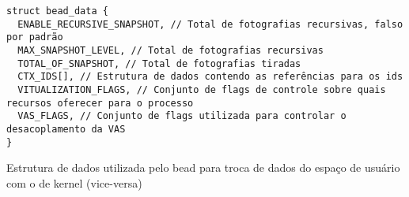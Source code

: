 \begin{pseudocode}

\begin{lstlisting}[language=pseudocode, style=pseudocode]
struct bead_data {
  ENABLE_RECURSIVE_SNAPSHOT, // Total de fotografias recursivas, falso por padrão
  MAX_SNAPSHOT_LEVEL, // Total de fotografias recursivas
  TOTAL_OF_SNAPSHOT, // Total de fotografias tiradas
  CTX_IDS[], // Estrutura de dados contendo as referências para os ids
  VITUALIZATION_FLAGS, // Conjunto de flags de controle sobre quais recursos oferecer para o processo
  VAS_FLAGS, // Conjunto de flags utilizada para controlar o desacoplamento da VAS
}

\end{lstlisting}

  \label{alg:beadata}
  \caption{Estrutura de dados utilizada pelo bead para troca de dados do espaço de usuário com o de kernel (vice-versa)}
\end{pseudocode}

